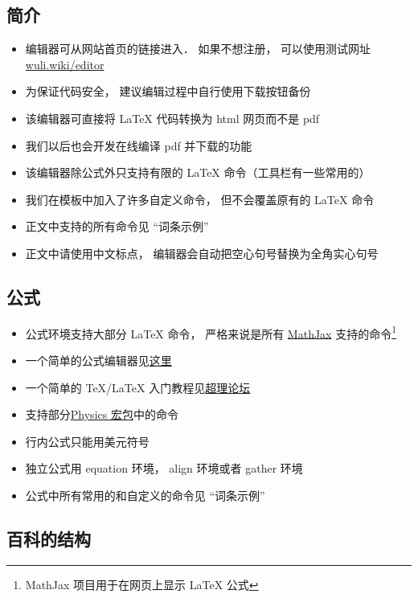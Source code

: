 
\subsection{简介}
\begin{itemize}
\item 编辑器可从网站首页的链接进入． 如果不想注册， 可以使用测试网址 \href{http://wuli.wiki/editor}{wuli.wiki/editor}
\item 为保证代码安全， 建议编辑过程中自行使用下载按钮备份
\item 该编辑器可直接将 LaTeX 代码转换为 html 网页而不是 pdf
\item 我们以后也会开发在线编译 pdf 并下载的功能
\item 该编辑器除公式外只支持有限的 LaTeX 命令（工具栏有一些常用的）
\item 我们在模板中加入了许多自定义命令， 但不会覆盖原有的 LaTeX 命令
\item 正文中支持的所有命令见 “词条示例”
\item 正文中请使用中文标点， 编辑器会自动把空心句号替换为全角实心句号
\end{itemize}

\subsection{公式}
\begin{itemize}
\item 公式环境支持大部分 LaTeX 命令， 严格来说是所有 \href{https://www.mathjax.org/}{MathJax} 支持的命令\footnote{MathJax 项目用于在网页上显示 LaTeX 公式}
\item 一个简单的公式编辑器见\href{https://www.codecogs.com/latex/eqneditor.php}{这里}
\item 一个简单的 TeX/LaTeX 入门教程见\href{https://chaoli.club/index.php/211}{超理论坛}
\item 支持部分\href{http://mirrors.ibiblio.org/CTAN/macros/latex/contrib/physics/physics.pdf}{Physics 宏包}中的命令
\item 行内公式只能用美元符号
\item 独立公式用 equation 环境， align 环境或者 gather 环境
\item 公式中所有常用的和自定义的命令见 “词条示例”
\end{itemize}

\subsection{百科的结构}

